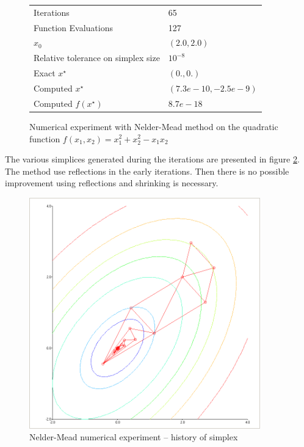 \begin{figure}[htbp]
\begin{center}
\begin{tabular}{|l|l|}
\hline
Iterations & 65 \\
Function Evaluations & 127 \\
$x_0$ & $(2.0,2.0)$ \\
Relative tolerance on simplex size & $10^{-8}$ \\
Exact $x^\star$ & $(0.,0.)$\\
Computed $x^\star$ & $(7.3e-10 , -2.5e-9)$\\
Computed $f(x^\star)$ & $8.7e-18$\\
\hline
\end{tabular}
\end{center}
\caption{Numerical experiment with Nelder-Mead method on the quadratic function
$f(x_1,x_2) = x_1^2 + x_2^2 - x_1 x_2$}
\label{fig-nm-numexp1-table}
\end{figure}


The various simplices generated during the iterations are 
presented in figure \ref{fig-nm-numexp1-historysimplex}.
The method use reflections in the early iterations. Then there
is no possible improvement using reflections and shrinking is necessary.

\begin{figure}
\begin{center}
\includegraphics[width=10cm]{quad2bis-nm-simplexcontours.png}
\end{center}
\caption{Nelder-Mead numerical experiment -- history of simplex}
\label{fig-nm-numexp1-historysimplex}
\end{figure}


